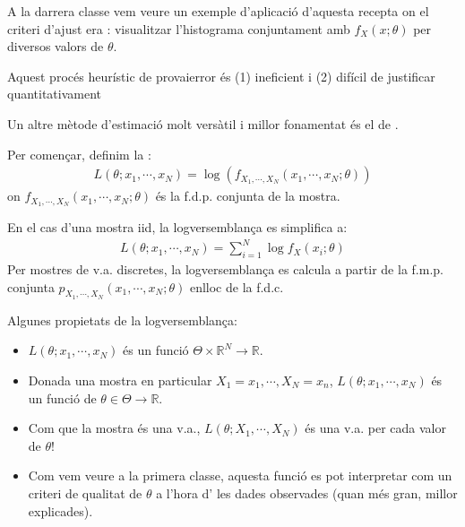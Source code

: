 \documentclass[letterpaper,10pt,english]{sphinxmanual}
\let\sphinxpxdimen\pdfpxdimen\else\newdimen\sphinxpxdimen
\begin{document}
A la darrera classe vem veure un exemple d’aplicació d’aquesta recepta
on el criteri d’ajust era : visualitzar l’histograma conjuntament
amb \(f_X(x;\theta)\) per diversos valors de \(\theta\).

\begin{figure}[htbp]
\centering

\noindent\sphinxincludegraphics[height=350\sphinxpxdimen]{{heuristic_fit}.png}
\end{figure}

Aquest procés heurístic de prova\sphinxhyphen{}i\sphinxhyphen{}error és (1) ineficient i (2) difícil de justificar
quantitativament

Un altre mètode
d’estimació molt versàtil i millor fonamentat
és el de .

Per començar, definim la :
\begin{equation*}
\begin{split}L(\theta; x_1, \cdots, x_N) = \log \left(f_{X_1, \cdots, X_N}(x_1, \cdots, x_N; \theta) \right)\end{split}
\end{equation*}
on \(f_{X_1, \cdots, X_N}(x_1, \cdots, x_N; \theta)\) és la
f.d.p. conjunta de la mostra.

En el cas d’una mostra iid, la log\sphinxhyphen{}versemblança es simplifica a:
\begin{equation*}
\begin{split}L(\theta; x_1, \cdots, x_N) = \sum_{i=1}^N \log f_X(x_i;\theta)\end{split}
\end{equation*}
Per mostres de v.a. discretes, la log\sphinxhyphen{}versemblança es calcula a partir de la f.m.p. conjunta \(p_{X_1, \cdots, X_N}(x_1, \cdots, x_N; \theta)\)
enlloc de la f.d.c.

Algunes propietats de la log\sphinxhyphen{}versemblança:
\begin{itemize}
\item {} 
\(L(\theta; x_1, \cdots, x_N)\) és un funció \(\Theta \times \mathbb{R}^N \to \mathbb{R}\).

\item {} 
Donada una mostra en particular \(X_1=x_1, \cdots, X_N=x_n\), \(L(\theta; x_1, \cdots, x_N)\) és un funció de \(\theta \in \Theta \to \mathbb{R}\).

\item {} 
Com que la mostra és una v.a., \(L(\theta; X_1, \cdots, X_N)\) és una v.a. per cada valor de \(\theta\)!

\item {} 
Com vem veure a la primera classe, aquesta funció es pot interpretar com un criteri de qualitat de \(\theta\) a l’hora d’ les dades observades (quan més gran, millor explicades).

\end{itemize}
\end{document}
